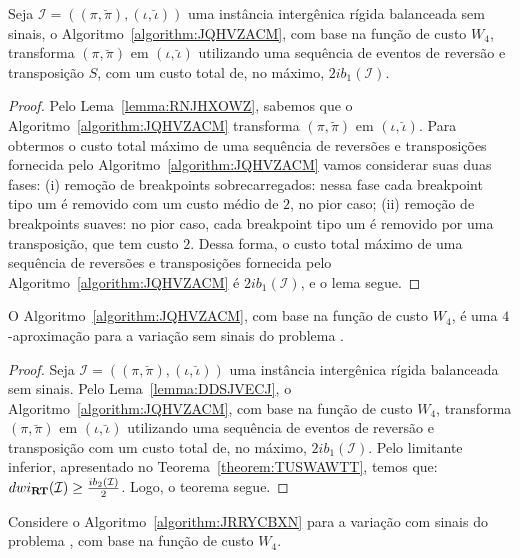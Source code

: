 \begin{lemma}\label{lemma:DDSJVECJ}
Seja $\mathcal{I}=((\pi,\breve\pi),(\iota,\breve\iota))$ uma instância intergênica rígida balanceada sem sinais, o Algoritmo~\ref{algorithm:JQHVZACM}, com base na função de custo $W_4$, transforma $(\pi,\breve\pi)$ em $(\iota,\breve\iota)$ utilizando uma sequência de eventos de reversão e transposição $S$, com um custo total de, no máximo, $2ib_1(\mathcal{I})$.
\end{lemma}
\begin{proof}
Pelo Lema~\ref{lemma:RNJHXOWZ}, sabemos que o Algoritmo~\ref{algorithm:JQHVZACM} transforma $(\pi,\breve\pi)$ em $(\iota,\breve\iota)$. Para obtermos o custo total máximo de uma sequência de reversões e transposições fornecida pelo Algoritmo~\ref{algorithm:JQHVZACM} vamos considerar suas duas fases: (i) remoção de breakpoints sobrecarregados: nessa fase cada breakpoint tipo um é removido com um custo médio de $2$, no pior caso; (ii) remoção de breakpoints suaves: no pior caso, cada breakpoint tipo um é removido por uma transposição, que tem custo $2$. Dessa forma, o custo total máximo de uma sequência de reversões e transposições fornecida pelo Algoritmo~\ref{algorithm:JQHVZACM} é $2ib_1(\mathcal{I})$, e o lema segue. 
\end{proof}

\begin{theorem}\label{theorem:CQXBDUDY}
O Algoritmo~\ref{algorithm:JQHVZACM}, com base na função de custo $W_4$, é uma $4$-aproximação para a variação sem sinais do problema \SbWIRT{}.
\end{theorem}
\begin{proof}
Seja $\mathcal{I} = ((\pi,\breve\pi),(\iota,\breve\iota))$ uma instância intergênica rígida balanceada sem sinais. Pelo Lema~\ref{lemma:DDSJVECJ}, o Algoritmo~\ref{algorithm:JQHVZACM}, com base na função de custo $W_4$, transforma $(\pi,\breve\pi)$ em $(\iota,\breve\iota)$ utilizando uma sequência de eventos de reversão e transposição com um custo total de, no máximo, $2ib_1(\mathcal{I})$. Pelo limitante inferior, apresentado no Teorema~\ref{theorem:TUSWAWTT}, temos que: $dwi_{\textbf{RT}}(\mathcal{I}) \ge \frac{ib_2(\mathcal{I})}{2}$. Logo, o teorema segue.
\end{proof}

Considere o Algoritmo~\ref{algorithm:JRRYCBXN} para a variação com sinais do problema \SbWIRT{}, com base na função de custo $W_4$.



